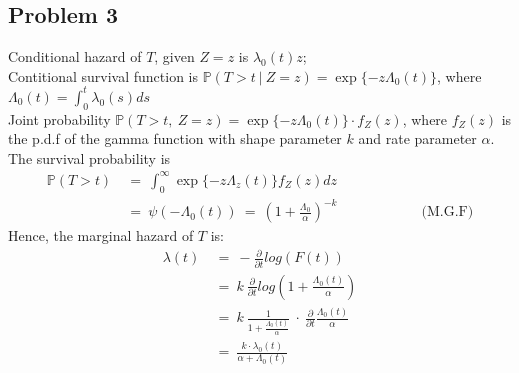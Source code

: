 \documentclass[11pt]{extarticle} %
\newcommand{\Prob}{\mathds{P}}
\begin{document}
\subsection*{Problem 3}
\noindent
Conditional hazard of $T$, given $Z=z$ is $\lambda_0(t)z$; \\
Contitional survival function is $\Prob(T > t\ |\ Z=z) = \exp\{-z \Lambda_0(t) \}$, where $\Lambda_0(t) = \int_0^t \lambda_0(s)ds$ \\
Joint probability $\Prob(T > t,\ Z=z) = \exp\{-z \Lambda_0(t) \}\cdot f_Z(z)$, where $f_Z(z)$ is the p.d.f of the gamma function with shape parameter $k$ and rate parameter $\alpha$. \\
The survival probability is 
\begin{align*}
\Prob(T > t) \ &{=}\ \int_0^{\infty} \exp\{-z \Lambda_z(t) \} f_Z(z) dz \\
\ &{=}\ \psi(-\Lambda_0(t)) \ =\ \left(1 + \frac{\Lambda_0}{\alpha} \right)^{-k} \hspace{1in} \text{(M.G.F)}
\end{align*}
\noindent
Hence, the marginal hazard of $T$ is:
\begin{align*}
\lambda(t) \ &{=}\ -\frac{\partial}{\partial t} log(F(t))\\
\ &{=}\ k\ \frac{\partial}{\partial t} log\left(1 + \frac{\Lambda_0(t)}{\alpha} \right) \\
\ &{=}\ k\ \frac{1}{1 + \frac{\Lambda_0(t)}{\alpha}}\ \cdot\ \frac{\partial}{\partial t} \frac{\Lambda_0(t)}{\alpha}  \\
\ &{=}\ \frac{k\cdot \lambda_0(t)}{\alpha + \Lambda_0(t)} 
\end{align*}
\end{document}
